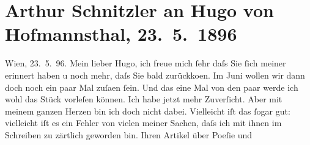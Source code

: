 

         
         \newcommand{\erwaehntePersonen}{Personen: Richard Beer-Hofmann, Otto Brahm, Johann Wolfgang von Goethe, Friedrich Hebbel, Hugo von Hofmannsthal, Gotthold Ephraim Lessing, Felix Salten, Gustav Schwarzkopf, Hippolyte Taine}
         \newcommand{\erwaehnteInstitutionen}{}
         \newcommand{\erwaehnteOrte}{Orte: Dänemark, Norwegen, Schweden, Tlumatsch, Wien}
         \newcommand{\erwaehnteWerke}{Werke: ?? [Englischer Kriminalroman], Der Zerrissene, Die Frau des Weisen. Erzählung, Die Revolution, Freiwild. Schauspiel in 3 Akten, Ollapatrida des durchgetriebenen Fuchsmundi, Poesie und Leben. Aus einem Vortrage, West-östlicher Divan}
               \section[Arthur Schnitzler an Hugo von Hofmannsthal, 23. 5. 1896]{ Arthur Schnitzler an Hugo von Hofmannsthal, 23. 5. 1896}\nopagebreak{}\rehead{ }\begin{ledgroupsized}[t]{13cm}\normalsize\beginnumbering \toendnotes[C]{\smallbreak\pagebreak[2]} 
\toendnotes[C]{\smallbreak}\pstart
           \raggedleft{}{\pb}Wien, 23. 5. 96.\pend
           \pstart
           Mein lieber Hugo, ich freue mich ſehr daſs Sie ſich meiner
                    erinnert haben u noch mehr, daſs Sie bald zurückko{\geminationm}en. Im Juni wollen wir dann doch noch ein paar Mal zuſa{\geminationm}en ſein. Und das eine Mal von den paar werde ich
                    wohl das Stück vorleſen
                    können. Ich habe jetzt mehr Zuverſicht. Aber mit meinem ganzen Herzen bin ich
                    doch nicht dabei. Vielleicht iſt das ſogar gut: vielleicht {\pb}iſt es ein Fehler von vielen meiner Sachen, daſs ich
                    mit ihnen im Schreiben zu zärtlich geworden bin.\pend
           \pstart
           Ihren Artikel über Poeſie und

\end{ledgroupsized}
